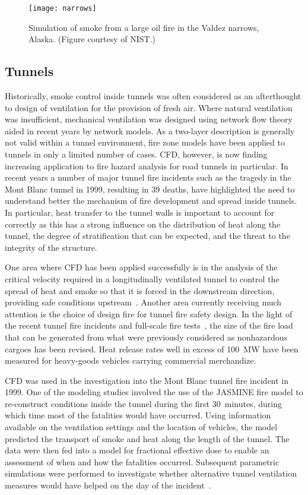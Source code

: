 \documentclass[graybox]{svmult}
\begin{document}
\begin{figure}[b]
\texttt{[image: narrows]}
\caption{Simulation of smoke from a large oil fire in the Valdez narrows, Alaska. (Figure courtesy of NIST.)}
\label{ALOFT}
\end{figure}


\subsection{Tunnels}

Historically, smoke control inside tunnels was often considered as an afterthought to design of ventilation for the provision of fresh air. Where natural ventilation was insufficient, mechanical ventilation was designed using network flow theory aided in recent years by network models. As a two-layer description is generally not valid within a tunnel environment, fire zone models have been applied to tunnels in only a limited number of cases. CFD, however, is now finding increasing application to fire hazard analysis for road tunnels in particular. In recent years a number of major tunnel fire incidents such as the tragedy in the Mont Blanc tunnel in 1999, resulting in 39 deaths, have highlighted the need to understand better the mechanism of fire development and spread inside tunnels. In particular, heat transfer to the tunnel walls is important to account for correctly as this has a strong influence on the distribution of heat along the tunnel, the degree of stratification that can be expected, and the threat to the integrity of the structure.

One area where CFD has been applied successfully is in the analysis of the critical velocity required in a longitudinally ventilated tunnel to control the spread of heat and smoke so that it is forced in the downstream direction, providing safe conditions upstream~\cite{Hwang}. Another area currently receiving much attention is the choice of design fire for tunnel fire safety design. In the light of the recent tunnel fire incidents and full-scale fire tests~\cite{Ingason}, the size of the fire load that can be generated from what were previously considered as nonhazardous cargoes has been revised. Heat release rates well in excess of 100~MW have been measured for heavy-goods vehicles carrying commercial merchandize.

CFD was used in the investigation into the Mont Blanc tunnel fire incident in 1999. One of the modeling studies involved the use of the JASMINE fire model to re-construct conditions inside the tunnel during the first 30~minutes, during which time most of the fatalities would have occurred. Using information available on the ventilation settings and the location of vehicles, the model predicted the transport of smoke and heat along the length of the tunnel. The data were then fed into a model for fractional effective dose to enable an assessment of when and how the fatalities occurred. Subsequent parametric simulations were performed to investigate whether alternative tunnel ventilation measures would have helped on the day of the incident~\cite{Miles:2004}.
\end{document}
